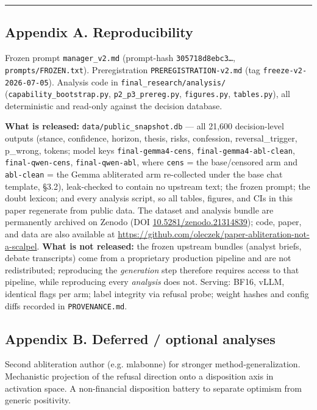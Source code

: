 \documentclass[
  10pt,
]{article}
\begin{document}
\begin{center}\rule{0.5\linewidth}{0.5pt}\end{center}

\subsection{Appendix A.
Reproducibility}\label{appendix-a-reproducibility}

Frozen prompt \texttt{manager\_v2.md} (prompt-hash
\texttt{305718d8ebc3…}, \texttt{prompts/FROZEN.txt}). Preregistration
\texttt{PREREGISTRATION-v2.md} (tag \texttt{freeze-v2-2026-07-05}).
Analysis code in \texttt{final\_research/analysis/}
(\texttt{capability\_bootstrap.py}, \texttt{p2\_p3\_prereg.py},
\texttt{figures.py}, \texttt{tables.py}), all deterministic and
read-only against the decision database.

\textbf{What is released:} \texttt{data/public\_snapshot.db} --- all
21,600 decision-level outputs (stance, confidence, horizon, thesis,
risks, confession, reversal\_trigger, p\_wrong, tokens; model keys
\texttt{final-gemma4-cens}, \texttt{final-gemma4-abl-clean},
\texttt{final-qwen-cens}, \texttt{final-qwen-abl}, where \texttt{cens} =
the base/censored arm and \texttt{abl-clean} = the Gemma abliterated arm
re-collected under the base chat template, §3.2), leak-checked to
contain no upstream text; the frozen prompt; the doubt lexicon; and
every analysis script, so all tables, figures, and CIs in this paper
regenerate from public data. The dataset and analysis bundle are
permanently archived on Zenodo (DOI
\href{https://doi.org/10.5281/zenodo.21314839}{10.5281/zenodo.21314839});
code, paper, and data are also available at
\url{https://github.com/oleczek/paper-abliteration-not-a-scalpel}.
\textbf{What is not released:} the frozen
upstream bundles (analyst briefs, debate transcripts) come from a
proprietary production pipeline and are not redistributed; reproducing
the \emph{generation} step therefore requires access to that pipeline,
while reproducing every \emph{analysis} does not. Serving: BF16, vLLM,
identical flags per arm; label integrity via refusal probe; weight
hashes and config diffs recorded in \texttt{PROVENANCE.md}.

\subsection{Appendix B. Deferred / optional
analyses}\label{appendix-b-deferred--optional-analyses}

Second
abliteration author (e.g. mlabonne) for stronger method-generalization.
Mechanistic projection of the refusal direction onto a disposition axis
in activation space. A non-financial disposition battery to separate
optimism from generic positivity.
\end{document}
